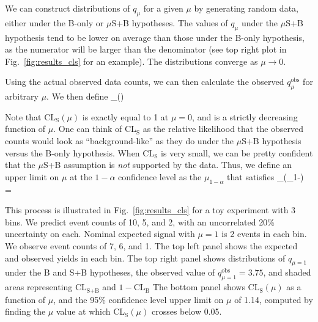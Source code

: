 We can construct distributions of $q_\mu$ for a given $\mu$ by generating random data, either under the B-only
or $\mu$S+B hypotheses. The values of $q_\mu$ under the $\mu$S+B hypothesis tend to be lower on average than those 
under the B-only hypothesis, as the numerator will be larger than the denominator (see top right plot in 
Fig.~\ref{fig:results_cls} for an example). The distributions converge as $\mu\to0$.

Using the actual observed data counts, we can then calculate the observed $q_\mu^\text{obs}$ for arbitrary $\mu$.
We then define
\be
{}_(\mu) \equiv {} \equiv
{}
\ee

Note that $\text{CL}_\text{S}(\mu)$ is exactly equal to 1 at $\mu=0$, and is a strictly decreasing function of $\mu$.
One can think of $\text{CL}_\text{S}$ as the relative likelihood that the observed counts would look as ``background-like''
as they do under the $\mu$S+B hypothesis versus the B-only hypothesis. When CL$_\text{S}$ is very small,
we can be pretty confident that the $\mu$S+B assumption is \textit{not} supported by the data. Thus, we define
an upper limit on $\mu$ at the $1-\alpha$ confidence level as the $\mu_{1-\alpha}$ that satisfies
\be
{}_(\mu_{1-\alpha}) = \alpha
\ee

This process is illustrated in Fig.~\ref{fig:results_cls} for a toy experiment with 3 bins. We predict event counts of 
10, 5, and 2, with an uncorrelated 20\% uncertainty on each. Nominal expected signal with $\mu=1$ is
2 events in each bin. We observe event counts of 7, 6, and 1. The top left panel shows the expected and observed
yields in each bin. The top right panel shows distributions of $q_{\mu=1}$ under the B and S+B hypotheses, the
observed value of $q_{\mu=1}^\text{obs}=3.75$, and shaded areas representing CL$_\text{S+B}$ and $1-\text{CL}_\text{B}$
The bottom panel shows CL$_\text{S}(\mu)$ as a function of $\mu$, and the 95\% confidence level upper limit
on $\mu$ of 1.14, computed by finding the $\mu$ value at which CL$_\text{S}(\mu)$ crosses below 0.05.

